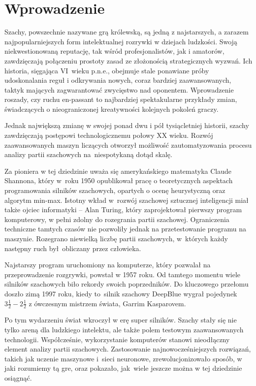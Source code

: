 \section{Wprowadzenie}
\label{sec:wprowadzenie}

Szachy, powszechnie nazywane grą królewską, są jedną z najstarszych, a zarazem najpopularniejszych form intelektualnej rozrywki w dziejach ludzkości.
Swoją niekwestionowaną reputację, tak wśród profesjonalistów, jak i amatorów, zawdzięczają połączeniu prostoty zasad ze złożonością strategicznych wyzwań.
Ich historia, sięgająca VI~wieku p.n.e., obejmuje stale ponawiane próby udoskonalania reguł i odkrywania nowych, coraz bardziej zaawansowanych, taktyk mających zagwarantować zwycięstwo nad oponentem.
Wprowadzenie roszady, czy ruchu en-passant to najbardziej spektakularne przykłady zmian, świadczących o nieograniczonej kreatywności kolejnych pokoleń graczy.


Jednak największą zmianę w swojej ponad dwu i pół tysiącletniej historii, szachy zawdzięczają postępowi technologicznemu połowy XX wieku.
Rozwój zaawansowanych maszyn liczących otworzył możliwość zautomatyzowania procesu analizy partii szachowych na~niespotykaną dotąd skalę.


Za pioniera w tej dziedzinie uważa się amerykańskiego matematyka Claude Shannona, który w~roku 1950 opublikował pracę o teoretycznych aspektach programowania silników szachowych, opartych o ocenę heurystyczną oraz algorytm min-max.
Istotny wkład w~rozwój szachowej sztucznej inteligencji miał także ojciec informatyki – Alan Turing, który zaprojektował pierwszy program komputerowy, w pełni zdolny do rozegrania partii szachowej.
Ograniczenia techniczne tamtych czasów nie pozwoliły jednak na przetestowanie programu na maszynie.
Rozegrano niewielką liczbę partii szachowych, w~których każdy następny ruch był~obliczany przez człowieka.


Najstarszy program uruchomiony na komputerze, który pozwalał na przeprowadzenie rozgrywki, powstał w 1957 roku.
Od tamtego momentu wiele silników szachowych biło rekordy swoich poprzedników.
Do kluczowego przełomu doszło zimą 1997 roku, kiedy to~silnik szachowy DeepBlue wygrał pojedynek $3\frac{1}{2} - 2\frac{1}{2}$ z ówczesnym mistrzem świata, Garrim Kasparovem.


Po tym wydarzeniu świat wkroczył w erę super silników.
Szachy stały się nie tylko areną dla ludzkiego intelektu, ale także polem testowym zaawansowanych technologii.
Współcześnie, wykorzystanie komputerów stanowi nieodłączny element analizy partii szachowych.
Zastosowanie najnowocześniejszych rozwiązań, takich jak uczenie maszynowe i~sieci neuronowe, zrewolucjonizowało sposób, w jaki rozumiemy tą gre, oraz pokazało, jak~wiele jeszcze można w tej dziedzinie osiągnąć.

